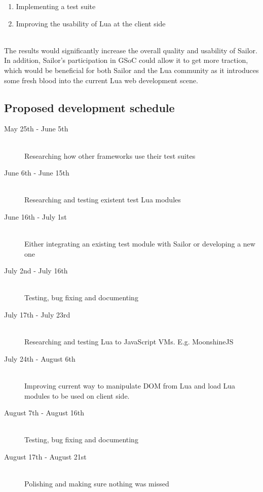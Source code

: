 \documentclass{article}
\begin{document}
\begin{enumerate}\item Implementing a test suite
\item Improving the usability of Lua at the client side
\end{enumerate}\item \\

The results would significantly increase the overall quality and usability of Sailor. In addition, Sailor's participation in GSoC could allow it to get more traction, which would be beneficial for both Sailor and the Lua community as it introduces some fresh blood into the current Lua web development scene. 

\subsection{Proposed development schedule}

		\begin{description}
	  \item[May 25th - June 5th] \hfill \\
	  Researching how other frameworks use their test suites
	  \item[June 6th - June 15th] \hfill \\
	  Researching and testing existent test Lua modules
	  \item[June 16th - July 1st] \hfill \\
	  Either integrating an existing test module with Sailor or developing a new one
	  \item[July 2nd - July 16th] \hfill \\
	  Testing, bug fixing and documenting
			\item[July 17th - July 23rd] \hfill \\
	  Researching and testing Lua to JavaScript VMs. E.g. MoonshineJS
			\item[July 24th - August 6th] \hfill \\
	  Improving current way to manipulate DOM from Lua and load Lua modules to be used on client side.
			\item[August 7th - August 16th] \hfill \\
	  Testing, bug fixing and documenting
			\item[August 17th - August 21st] \hfill \\
	  Polishing and making sure nothing was missed
		\end{description}
		
\end{document}
